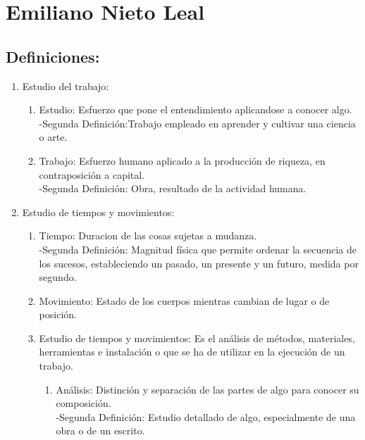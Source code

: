 \section{Emiliano Nieto Leal}
\subsection{Definiciones:}

\begin{enumerate}
    \item Estudio del trabajo:
        \begin{enumerate}   
           \item Estudio: Esfuerzo que pone el entendimiento aplicandose a conocer algo.     \cite{RAE}
           \\-Segunda Definición:Trabajo empleado en aprender y cultivar una ciencia o arte. \cite{RAE}
           \item Trabajo: Esfuerzo humano aplicado a la producción de riqueza, en contraposición a capital. \cite{RAE}
           \\-Segunda Definición: Obra, resultado de la actividad humana. \cite{RAE}
    \end{enumerate}
    \item Estudio de tiempos y movimientos:
        \begin{enumerate}   
           \item Tiempo: Duracion de las cosas sujetas a mudanza. \cite{RAE}
           \\-Segunda Definición: Magnitud física que permite ordenar la secuencia de los sucesos, estableciendo un pasado, un presente y un futuro, medida por segundo. \cite{RAE}
           \item Movimiento: Estado de los cuerpos mientras cambian de lugar o de posición. \cite{RAE}
           \item Estudio de tiempos y movimientos: Es el análisis de métodos, materiales, herramientas e instalación o que se ha de utilizar en la ejecución de un trabajo. \cite{RAE}
           \begin{enumerate}   
            \item Análisis: Distinción y separación de las partes de algo para conocer su composición. \cite{RAE}
            \\-Segunda Definición: Estudio detallado de algo, especialmente de una obra o de un escrito.  \cite{RAE}
            \end{enumerate}
    \end{enumerate}

\end{enumerate}
